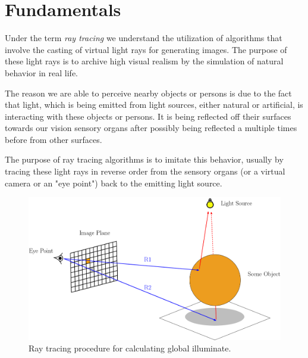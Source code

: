 \chapter{Fundamentals}
\label{chap:fundamentals}

Under the term \emph{ray tracing} we understand the utilization of algorithms that involve the casting of virtual light rays for generating images. The purpose of these light rays is to archive high visual realism by the simulation of natural behavior in real life. 

The reason we are able to perceive nearby objects or persons is due to the fact that light, which is being emitted from light sources, either natural or artificial, is interacting with these objects or persons. It is being reflected off their surfaces towards our vision sensory organs after possibly being reflected a multiple times before from other surfaces.

The purpose of ray tracing algorithms is to imitate this behavior, usually by tracing these light rays in reverse order from the sensory organs (or a virtual camera or an "eye point") back to the emitting light source.

\begin{figure}[h]
	\centering
	\includegraphics[width=.9\linewidth]{img/1 fundamentals/ray_tracing.png}
	\caption{Ray tracing procedure for calculating global illuminate.}
	\label{fig:raytracer_general}
\end{figure}


